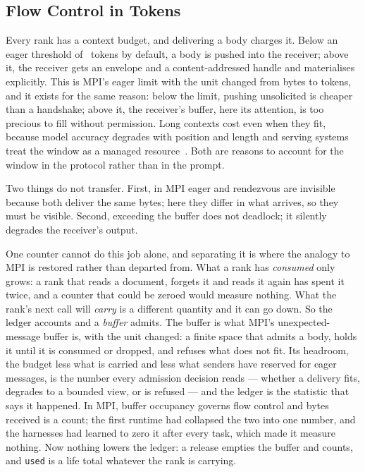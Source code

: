 \documentclass[sigconf,nonacm]{acmart}
\newcommand{\code}[1]{\texttt{\small #1}}
\begin{document}
\subsection{Flow Control in Tokens}
\label{sec:flow}

Every rank has a context budget, and delivering a body charges it. Below an
eager threshold of \eagerThreshold\ tokens by default, a body is pushed into the
receiver; above it, the receiver gets an envelope and a content-addressed handle
and materialises explicitly. This is MPI's eager limit with the unit changed from
bytes to tokens, and it exists for the same reason: below the limit, pushing
unsolicited is cheaper than a handshake; above it, the receiver's buffer, here its
attention, is too precious to fill without permission. Long contexts cost even
when they fit, because model accuracy degrades with position and length and
serving systems treat the window as a managed
resource~\cite{liu2024lostmiddle,kwon2023vllm}. Both are reasons to account for
the window in the protocol rather than in the prompt.

Two things do not transfer. First, in MPI eager and rendezvous are invisible
because both deliver the same bytes; here they differ in what arrives, so they
must be visible. Second, exceeding the buffer does not deadlock; it silently
degrades the receiver's output.

One counter cannot do this job alone, and separating it is where the analogy to
MPI is restored rather than departed from. What a rank has \emph{consumed} only
grows: a rank that reads a document, forgets it and reads it again has spent it
twice, and a counter that could be zeroed would measure nothing. What the rank's
next call will \emph{carry} is a different quantity and it can go down. So the
ledger accounts and a \emph{buffer} admits. The buffer is what MPI's
unexpected-message buffer is, with the unit changed: a finite space that admits
a body, holds it until it is consumed or dropped, and refuses what does not fit.
Its headroom, the budget less what is carried and less what senders have
reserved for eager messages, is the number every admission decision reads ---
whether a delivery fits, degrades to a bounded view, or is refused --- and the
ledger is the statistic that says it happened. In MPI, buffer occupancy governs
flow control and bytes received is a count; the first runtime had collapsed the
two into one number, and the harnesses had learned to zero it after every task,
which made it measure nothing. Now nothing lowers the ledger: a release empties
the buffer and counts, and \code{used} is a life total whatever the rank is
carrying.
\end{document}
